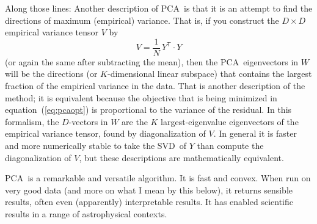 \documentclass[12pt, letterpaper]{article}
\newcommand{\equationname}{equation}
\newcommand{\acronym}[1]{{\small{#1}}}
\newcommand{\PCA}{\acronym{PCA}}
\newcommand{\SVD}{\acronym{SVD}}
\newcommand{\T}{^{\mathsf{T}}}
\begin{document}
Along those lines:
Another description of \PCA\ is that it is an attempt to find the directions of
maximum (empirical) variance.
That is, if you construct the $D\times D$ empirical variance tensor $V$ by
\begin{equation}
V = \frac{1}{N}\,Y\T \cdot Y
\end{equation}
(or again the same after subtracting the mean),
then the \PCA\ eigenvectors in $W$ will be the directions (or $K$-dimensional
linear subspace) that contains the largest fraction of the empirical variance in the data.
That is another description of the method; it is equivalent
because the objective that is being minimized in \equationname~(\ref{eq:pcaopt})
is proportional to the variance of the residual.
In this formalism, the $D$-vectors in $W$ are the $K$ largest-eigenvalue
eigenvectors of the empirical variance tensor, found by diagonalization of $V$.
In general it is faster and more numerically stable to take the \SVD\ of $Y$
than compute the diagonalization of $V$, but these descriptions are mathematically
equivalent.

\PCA\ is a remarkable and versatile algorithm.
It is fast and convex.
When run on very good data (and more on what I mean by this below), it returns
sensible results, often even (apparently) interpretable results.
It has enabled scientific results in a range of astrophysical contexts.
\end{document}
